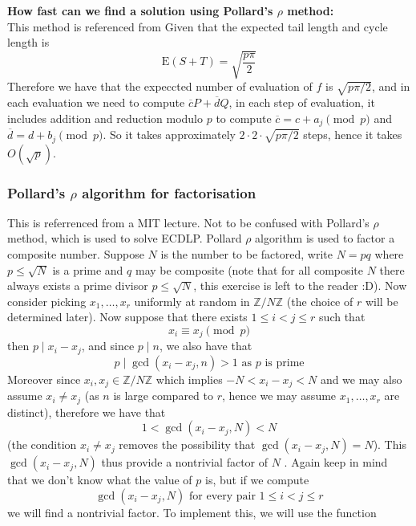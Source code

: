 \documentclass[a4 paper]{article}
\newcommand{\?}{\stackrel{?}{=}}
\begin{document}
\begin{note}{\bcicosaedre}
\textbf{How fast can we find a solution using Pollard's $ \rho $ method:}  \\ 
This method is referenced from Given that the expected tail length and cycle length is  
$$ \text{E}(S+T) = \sqrt{\frac{p \pi }{2} } $$
Therefore we have that the expeccted number of evaluation of $ f $ is $ \sqrt{p \pi / 2}$, and in each evaluation we need to compute $ \overline{c} P + \overline{d} Q $, in each step of evaluation, it includes addition and reduction modulo $ p $ to compute $ \overline{c} = c  + a_j \pmod p $ and $ \overline{d} = d + b_j \pmod p $. So it takes approximately $ 2 \cdot 2 \cdot \sqrt{p \pi/ 2} $ steps, hence it takes $ \boxed{O (\sqrt{p})} $. 
\end{note}

\subsubsection{Pollard's \texorpdfstring{$ \rho $}{TEXT} algorithm for factorisation}
This is referrenced from a MIT lecture. Not to be confused with Pollard's $ \rho $ method, which is used to solve ECDLP. Pollard $ \rho $ algorithm is used to factor a composite number. Suppose $ N $ is the number to be factored, write $ N = pq $ where $ p \leq \sqrt{N}  $ is a prime and $ q $ may be composite (note that for all composite $ N $ there always exists a prime divisor $ p \leq \sqrt{N} $, this exercise is left to the reader :D). Now consider picking $ x_1 , \dots, x_r $ uniformly at random in $ \mathbb{Z} / N \mathbb{Z} $ (the choice of $ r $ will be determined later). Now suppose that there exists $ 1 \leq i < j \leq r $ such that 
$$ x_i \equiv x_j \pmod p $$
then $ p \mid x_i - x_j  $, and since $ p \mid n $, we also have that 
$$ p\mid \gcd(x_i - x_j , n) > 1 \text{ as } p \text{ is prime}$$
Moreover since $ x_i, x_j \in \mathbb{Z} /N \mathbb{Z} $ which implies $ -N < x_i - x_j < N $ and we may also assume $ x_i \neq x_j  $ (as $ n  $ is large compared to $ r $, hence we may assume $ x_1 , \dots, x_r $ are distinct), therefore  we have that
$$ 1 <   \gcd(x_i - x_j, N ) < N  $$
(the condition $ x_i \neq x_j $ removes the possibility that $ \gcd(x_i - x_j , N) =N $). This $ \gcd(x_i - x_j , N) $ thus provide a nontrivial factor of $ N $ . Again keep in mind that we don't know what the value of $ p $ is, but if we compute 
$$ \gcd(x_i - x_j , N) \text{ for every pair } 1 \leq i < j \leq r $$
we will find a nontrivial factor. To implement this, we will use the function 
\end{document}
